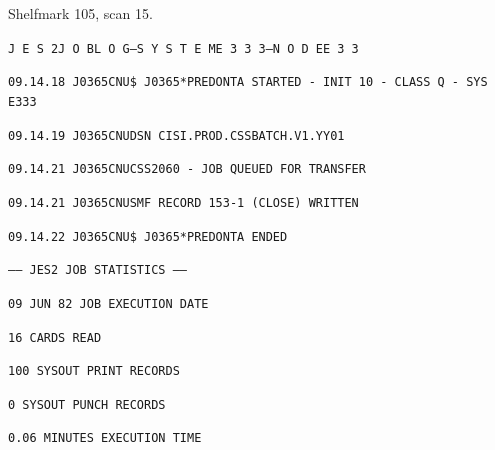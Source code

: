 Shelfmark 105, scan 15.

\texttt{J E S 2\quad J O B\quad L O G\quad --\quad S Y S T E M\quad E 3 3 3\quad --\quad N O D E\quad E 3 3}

\texttt{09.14.18 J0365CNU\quad \$ J0365*PREDONTA STARTED - INIT 10 - CLASS Q - SYS E333}

\texttt{09.14.19 J0365CNU\quad DSN CISI.PROD.CSSBATCH.V1.YY01}

\texttt{09.14.21 J0365CNU\quad CSS2060 - JOB QUEUED FOR TRANSFER}

\texttt{09.14.21 J0365CNU\quad SMF RECORD 153-1 (CLOSE) WRITTEN}

\texttt{09.14.22 J0365CNU\quad \$ J0365*PREDONTA ENDED}

\texttt{------ JES2 JOB STATISTICS ------}

\texttt{09 JUN 82 JOB EXECUTION DATE}

\texttt{16 CARDS READ}

\texttt{100 SYSOUT PRINT RECORDS}

\texttt{0 SYSOUT PUNCH RECORDS}

\texttt{0.06 MINUTES EXECUTION TIME}

